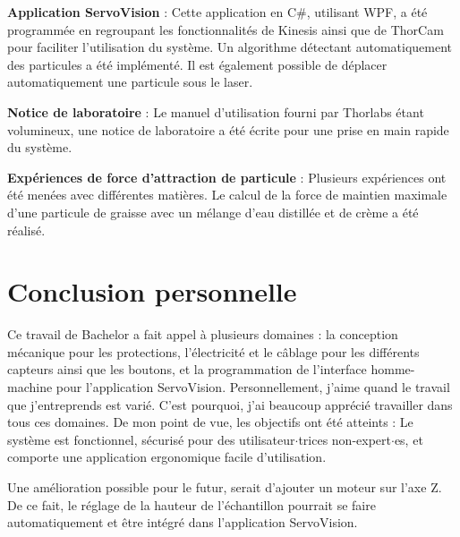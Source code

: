 \textbf{Application ServoVision} :
Cette application en C\#, utilisant WPF, a été programmée en regroupant les fonctionnalités de Kinesis ainsi que de ThorCam pour faciliter l'utilisation du système. Un algorithme détectant automatiquement des particules a été implémenté. Il est également possible de déplacer automatiquement une particule sous le laser.

\textbf{Notice de laboratoire} :
Le manuel d'utilisation fourni par Thorlabs étant volumineux, une notice de laboratoire a été écrite pour une prise en main rapide du système.

\textbf{Expériences de force d'attraction de particule} :
Plusieurs expériences ont été menées avec différentes matières. Le calcul de la force de maintien maximale d'une particule de graisse avec un mélange d'eau distillée et de crème a été réalisé.

\section*{Conclusion personnelle}
Ce travail de Bachelor a fait appel à plusieurs domaines : la conception mécanique pour les protections, l'électricité et le câblage pour les différents capteurs ainsi que les boutons, et la programmation de l'interface homme-machine pour l'application ServoVision. Personnellement, j'aime quand le travail que j'entreprends est varié. C'est pourquoi, j'ai beaucoup apprécié travailler dans tous ces domaines. De mon point de vue, les objectifs ont été atteints : Le système est fonctionnel, sécurisé pour des utilisateur\(\cdot\)trices non-expert\(\cdot\)es, et comporte une application ergonomique facile d'utilisation.

Une amélioration possible pour le futur, serait d'ajouter un moteur sur l'axe Z. De ce fait, le réglage de la hauteur de l'échantillon pourrait se faire automatiquement et être intégré dans l'application ServoVision.
\vfil
\hspace{8cm}\makeatletter\@author\makeatother\par
\hspace{8cm}\begin{minipage}{5cm}
    \printsignature
\end{minipage}